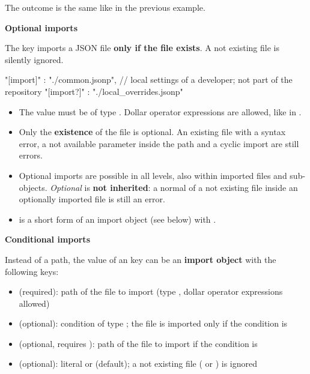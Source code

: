 The outcome is the same like in the previous example.


\newpage

\textbf{Optional imports}

The key  imports a JSON file \textbf{only if the file exists}. A not existing file is silently ignored.

\begin{pythoncode}[linebackgroundcolor=\hlcode{4}]
{
   "[import]"  : "./common.jsonp",
   // local settings of a developer; not part of the repository
   "[import?]" : "./local_overrides.jsonp"
}
\end{pythoncode}

\begin{itemize}
   \item The value must be of type . Dollar operator expressions are allowed, like in .
   \item Only the \textbf{existence} of the file is optional. An existing file with a syntax error, a not available parameter
         inside the path and a cyclic import are still errors.
   \item Optional imports are possible in all levels, also within imported files and sub-objects. \textit{Optional} is \textbf{not inherited}:
         a normal  of a not existing file inside an optionally imported file is still an error.
   \item {} is a short form of an import object (see below) with .
\end{itemize}

\vspace{2ex}

\textbf{Conditional imports}

Instead of a path, the value of an  key can be an \textbf{import object} with the following keys:

\begin{itemize}
   \item {} (required): path of the file to import (type , dollar operator expressions allowed)
   \item {} (optional): condition of type ; the file is imported only if the condition is 
   \item {} (optional, requires ): path of the file to import if the condition is 
   \item {} (optional): literal  or  (default); a not existing file
         ( or ) is ignored
\end{itemize}

